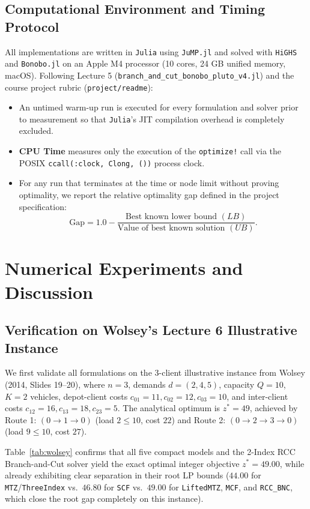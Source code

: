 \documentclass[11pt,a4paper]{article}
\begin{document}
\subsection{Computational Environment and Timing Protocol}
All implementations are written in \texttt{Julia} using \texttt{JuMP.jl} and solved with \texttt{HiGHS} and \texttt{Bonobo.jl} on an Apple M4 processor (10 cores, 24 GB unified memory, macOS). Following Lecture 5 (\texttt{branch\_and\_cut\_bonobo\_pluto\_v4.jl}) and the course project rubric (\texttt{project/readme}):
\begin{itemize}[noitemsep,topsep=2pt]
    \item An untimed warm-up run is executed for every formulation and solver prior to measurement so that \texttt{Julia}'s JIT compilation overhead is completely excluded.
    \item \textbf{CPU Time} measures only the execution of the \texttt{optimize!} call via the POSIX \texttt{ccall(:clock, Clong, ())} process clock.
    \item For any run that terminates at the time or node limit without proving optimality, we report the relative optimality gap defined in the project specification:
    \[
    \text{Gap} = 1.0 - \frac{\text{Best known lower bound } (LB)}{\text{Value of best known solution } (UB)}.
    \]
\end{itemize}

\section{Numerical Experiments and Discussion}

\subsection{Verification on Wolsey's Lecture 6 Illustrative Instance}
We first validate all formulations on the 3-client illustrative instance from Wolsey (2014, Slides 19--20), where $n = 3$, demands $d = (2, 4, 5)$, capacity $Q = 10$, $K = 2$ vehicles, depot-client costs $c_{01} = 11, c_{02} = 12, c_{03} = 10$, and inter-client costs $c_{12} = 16, c_{13} = 18, c_{23} = 5$. The analytical optimum is $z^* = 49$, achieved by Route 1: $(0 \to 1 \to 0)$ (load $2 \le 10$, cost $22$) and Route 2: $(0 \to 2 \to 3 \to 0)$ (load $9 \le 10$, cost $27$).

Table~\ref{tab:wolsey} confirms that all five compact models and the 2-Index RCC Branch-and-Cut solver yield the exact optimal integer objective $z^* = 49.00$, while already exhibiting clear separation in their root LP bounds ($44.00$ for \texttt{MTZ}/\texttt{ThreeIndex} vs.\ $46.80$ for \texttt{SCF} vs.\ $49.00$ for \texttt{LiftedMTZ}, \texttt{MCF}, and \texttt{RCC\_BNC}, which close the root gap completely on this instance).
\end{document}
